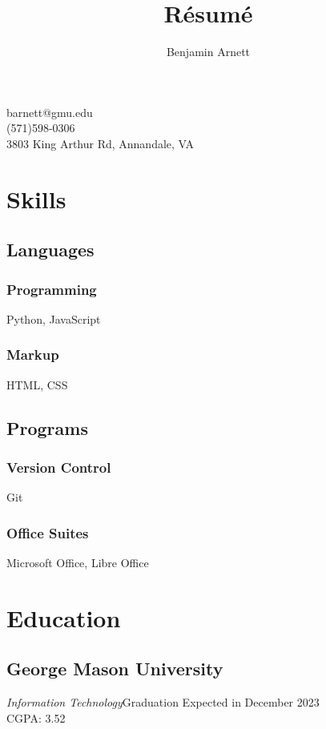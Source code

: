 \documentclass{article}
\makeatletter
\renewcommand{\maketitle}{
\begin{center}
{\huge\bfseries\theauthor}

\vspace{.25em}

barnett@gmu.edu \\
(571)598-0306 \\ 
3803 King Arthur Rd, Annandale, VA

\end{center}
}
\makeatother
\begin{document}
\title{R\'esum\'e}
\author{Benjamin Arnett}

\maketitle

\section{Skills}

\subsection{Languages}

\subsubsection{Programming}

Python, JavaScript

\subsubsection{Markup}

HTML, CSS

\subsection{Programs}

\subsubsection{Version Control}

Git

\subsubsection{Office Suites}

Microsoft Office, Libre Office

\section{Education}

\subsection{George Mason University}
\emph{Information Technology}\hfill Graduation Expected in December 2023\\CGPA: 3.52
\end{document}
